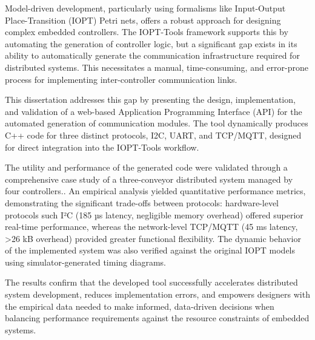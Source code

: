 
%

Model-driven development, particularly using formalisms like Input-Output Place-Transition (IOPT) Petri nets, offers a robust approach for designing complex embedded controllers. The IOPT-Tools framework supports this by automating the generation of controller logic, but a significant gap exists in its ability to automatically generate the communication infrastructure required for distributed systems. This necessitates a manual, time-consuming, and error-prone process for implementing inter-controller communication links.

This dissertation addresses this gap by presenting the design, implementation, and validation of a web-based Application Programming Interface (API) for the automated generation of communication modules. The tool dynamically produces C++ code for three distinct protocols, I2C, UART, and TCP/MQTT, designed for direct integration into the IOPT-Tools workflow.

The utility and performance of the generated code were validated through a comprehensive case study of a three-conveyor distributed system managed by four controllers.. An empirical analysis yielded quantitative performance metrics, demonstrating the significant trade-offs between protocols: hardware-level protocols such I²C (185 µs latency, negligible memory overhead) offered superior real-time performance, whereas the network-level TCP/MQTT (45 ms latency, >26 kB overhead) provided greater functional flexibility. The dynamic behavior of the implemented system was also verified against the original IOPT models using simulator-generated timing diagrams.

The results confirm that the developed tool successfully accelerates distributed system development, reduces implementation errors, and empowers designers with the empirical data needed to make informed, data-driven decisions when balancing performance requirements against the resource constraints of embedded systems.

